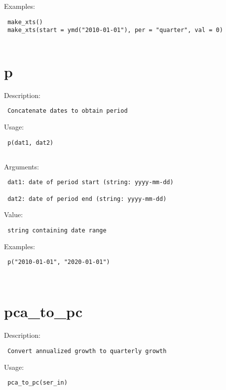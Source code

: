 \documentclass[
  letterpaper,
  DIV=11,
  numbers=noendperiod]{scrreport}
\begin{document}
Examples:

\begin{verbatim}
 make_xts()
 make_xts(start = ymd("2010-01-01"), per = "quarter", val = 0)
 
\end{verbatim}

\hypertarget{p}{%
\section{p}\label{p}}

Description:

\begin{verbatim}
 Concatenate dates to obtain period
\end{verbatim}

Usage:

\begin{verbatim}
 p(dat1, dat2)
 
\end{verbatim}

Arguments:

\begin{verbatim}
 dat1: date of period start (string: yyyy-mm-dd)

 dat2: date of period end (string: yyyy-mm-dd)
\end{verbatim}

Value:

\begin{verbatim}
 string containing date range
\end{verbatim}

Examples:

\begin{verbatim}
 p("2010-01-01", "2020-01-01")
 
 
\end{verbatim}

\hypertarget{pca_to_pc}{%
\section{pca\_to\_pc}\label{pca_to_pc}}

Description:

\begin{verbatim}
 Convert annualized growth to quarterly growth
\end{verbatim}

Usage:

\begin{verbatim}
 pca_to_pc(ser_in)
 
\end{verbatim}
\end{document}
